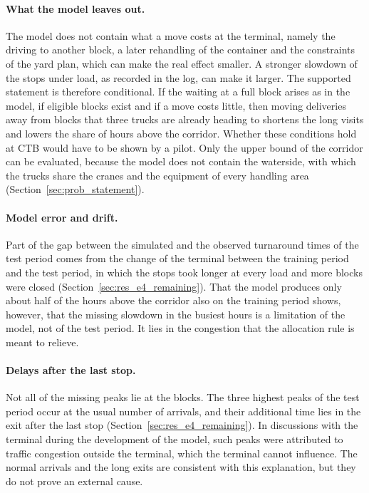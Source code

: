 \paragraph{What the model leaves out.} The model does not contain what a move costs
at the terminal, namely the driving to another block, a later rehandling of the
container and the constraints of the yard plan, which can make the real effect
smaller. A stronger slowdown of the stops under load, as recorded in the log, can make
it larger. The supported
statement is therefore conditional. If the waiting at a full block arises as in the
model, if eligible blocks exist and if a move costs little, then moving deliveries away
from blocks that three trucks are already heading to shortens the long visits and
lowers the share of hours above the corridor. Whether these conditions hold at CTB
would have to be shown by a pilot. Only the upper bound of the corridor can be
evaluated, because the model does not contain the waterside, with which the trucks
share the cranes and the equipment of every handling area
(Section~\ref{sec:prob_statement}).

\paragraph{Model error and drift.} Part of the gap between the simulated and the
observed turnaround times of the test period comes from the change of the terminal
between the training period and the test period, in which the stops took longer at
every load and more blocks were closed (Section~\ref{sec:res_e4_remaining}). That the
model produces only about half of the hours above the corridor also on the training
period shows, however, that the missing
slowdown in the busiest hours is a limitation of the model, not of the test period. It
lies in the congestion that the allocation rule is meant to relieve.

\paragraph{Delays after the last stop.} Not all of the missing peaks lie at the
blocks. The three highest peaks of the test period occur at the usual number of
arrivals, and their additional time lies in the exit after the last stop
(Section~\ref{sec:res_e4_remaining}). In discussions with the terminal during the
development of the model, such peaks were attributed to traffic congestion outside the
terminal, which the terminal cannot influence.  The normal arrivals and the long exits
are consistent with this explanation, but they do not prove an external cause.

